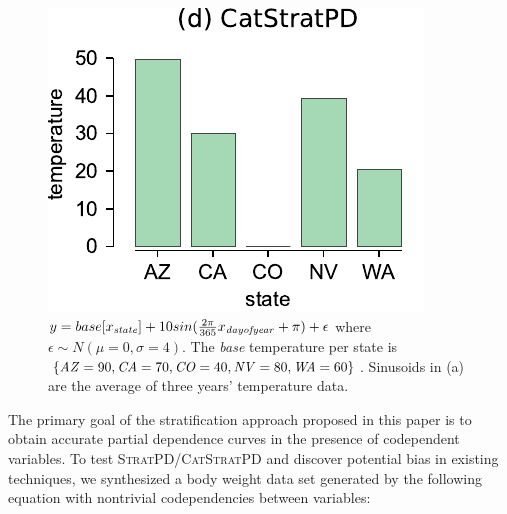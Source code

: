 \documentclass[smallextended]{svjour3}       %
\newcommand{\spd}{\fontfamily{cmr}\textsc{\small StratPD}}
\newcommand{\cspd}{\fontfamily{cmr}\textsc{\small CatStratPD}}
\begin{document}
\begin{figure}[!htbp]
\begin{center}
\includegraphics[scale=0.45]{images/state_vs_temp_stratpd.pdf}\vspace{-1mm}
\caption{\small $y = base[x_{\it state}] + 10 sin(\frac{2\pi}{365}x_{\it dayofyear}+\pi) + \epsilon$ where $\epsilon \sim N(\mu=0, \sigma=4)$. The {\em base} temperature per state is $\{{\it AZ}=90, {\it CA}=70, {\it CO}=40, {\it NV}=80, {\it WA}=60\}$. Sinusoids in (a) are the average of three years' temperature data.}
\label{fig:statetemp}
\end{center}
\end{figure}

The primary goal of the stratification approach proposed in this paper is to obtain accurate partial dependence curves in the presence of codependent variables. To test \spd{}/\cspd{} and discover potential bias in existing techniques, we synthesized a body weight data set generated by the following equation with nontrivial codependencies between variables: 
\vspace{-2mm}
\end{document}
